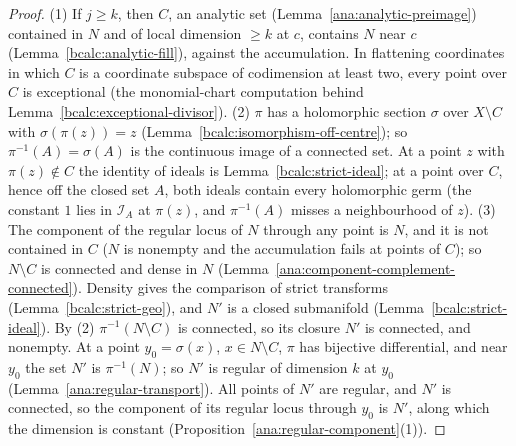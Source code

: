 \begin{proof}
\leanok
(1) If \(j\ge k\), then \(C\), an analytic set (Lemma~\ref{ana:analytic-preimage}) contained in \(N\) and of local dimension \(\ge k\) at \(c\), contains \(N\) near \(c\)
(Lemma~\ref{bcalc:analytic-fill}), against the accumulation. In flattening coordinates in which \(C\) is a coordinate subspace of codimension at least two, every point
over \(C\) is exceptional (the monomial-chart computation behind Lemma~\ref{bcalc:exceptional-divisor}).
(2) \(\pi\) has a holomorphic section \(\sigma\) over \(X\setminus C\) with \(\sigma(\pi(z))=z\) (Lemma~\ref{bcalc:isomorphism-off-centre}); so \(\pi^{-1}(A)=\sigma(A)\) is the continuous image
of a connected set. At a point \(z\) with \(\pi(z)\notin C\) the identity of ideals is Lemma~\ref{bcalc:strict-ideal}; at a point over \(C\), hence off the closed set \(A\), both
ideals contain every holomorphic germ (the constant \(1\) lies in \(\mathcal I_A\) at \(\pi(z)\), and \(\pi^{-1}(A)\) misses a neighbourhood of \(z\)).
(3) The component of the regular locus of \(N\) through any point is \(N\), and it is not contained in \(C\) (\(N\) is nonempty and the accumulation fails at points of
\(C\)); so \(N\setminus C\) is connected and dense in \(N\) (Lemma~\ref{ana:component-complement-connected}). Density gives the comparison of strict transforms
(Lemma~\ref{bcalc:strict-geo}), and \(N'\) is a closed submanifold (Lemma~\ref{bcalc:strict-ideal}). By (2) \(\pi^{-1}(N\setminus C)\) is connected, so its closure \(N'\) is
connected, and nonempty. At a point \(y_0=\sigma(x)\), \(x\in N\setminus C\), \(\pi\) has bijective differential, and near \(y_0\) the set \(N'\) is \(\pi^{-1}(N)\); so \(N'\) is
regular of dimension \(k\) at \(y_0\) (Lemma~\ref{ana:regular-transport}). All points of \(N'\) are regular, and \(N'\) is connected, so the component of its regular locus
through \(y_0\) is \(N'\), along which the dimension is constant (Proposition~\ref{ana:regular-component}(1)).
\end{proof}

